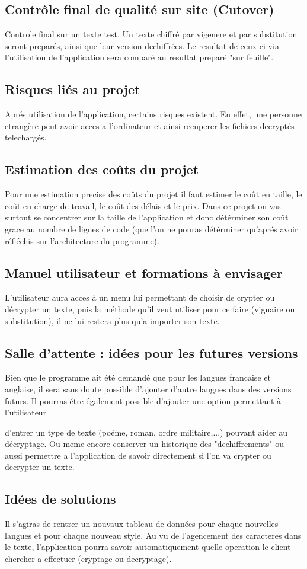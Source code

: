 \documentclass[a4]{article}
\begin{document}
		\subsection{Contrôle final de qualité sur site (Cutover)}
		Controle final sur un texte test. Un texte chiffré par vigenere et par substitution seront preparés, ainsi que leur version dechiffrées. Le resultat de ceux-ci via l'utilisation de l'application sera comparé au resultat preparé "sur feuille". 
		\subsection{Risques liés au projet}
		Aprés utilisation de l'application, certains risques existent. En effet, une personne etrangère peut avoir acces a l'ordinateur et ainsi recuperer les fichiers decryptés telechargés.
		\subsection{Estimation des coûts du projet}
		 	Pour une estimation precise des coûts du projet il faut estimer le coût en taille, 
			le coût en charge de travail, le coût des délais et le prix. Dans ce projet on vas surtout 
			se concentrer sur la taille de l'application et donc détérminer son coût grace au nombre de 
			lignes de code (que l'on ne pouras détérminer qu'aprés avoir réfléchis sur l'architecture du 				programme).		  		
		\subsection{Manuel utilisateur et formations à envisager}
			L'utilisateur aura acces à un menu lui permettant de choisir de crypter ou décrypter un texte,
			puis la méthode qu'il veut utiliser pour ce faire (vignaire ou substitution), il ne lui restera 
			plus qu'a importer son texte.
		\subsection{Salle d’attente : idées pour les futures versions}
			Bien que le programme ait été demandé que pour les langues francaise et anglaise, 
			il sera sans doute possible d'ajouter d'autre langues dans des versions futurs. 
			Il pourras étre également possible d'ajouter une option permettant à l'utilisateur

			d'entrer un type de texte (poéme, roman, ordre militaire,...) pouvant aider au décryptage. Ou meme encore conserver un historique des "dechiffrements" ou aussi permettre a l'application de savoir directement si l'on va crypter ou decrypter un texte.

		\subsection{Idées de solutions}
		 	Il s'agiras de rentrer un nouvaux tableau de données pour chaque nouvelles langues et pour 
			chaque nouveau style.
			Au vu de l'agencement des caracteres dans le texte, l'application pourra savoir automatiquement quelle operation le client chercher a effectuer (cryptage ou decryptage).
\end{document}
